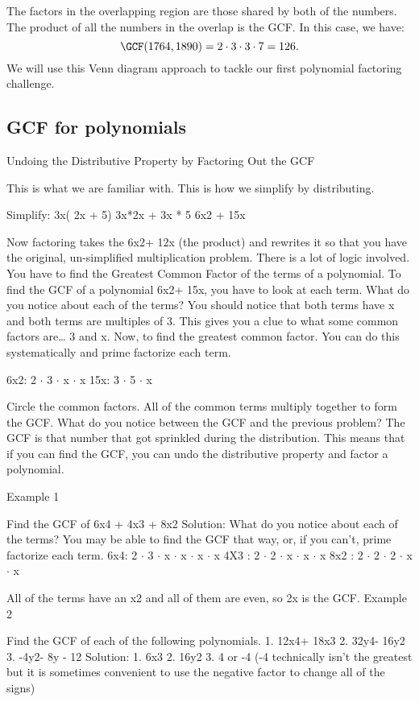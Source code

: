 The factors in the overlapping region are those shared by both of the numbers. The product of all the numbers in the overlap is the GCF. In this case, we have:
\[\GCF(1764, 1890) = 2\cdot3\cdot3\cdot7 = 126.\]
We will use this Venn diagram approach to tackle our first polynomial factoring challenge.

\subsection{{GCF} for polynomials}

Undoing the Distributive Property by Factoring Out the GCF

This is what we are familiar with. This is how we simplify by distributing.

 Simplify:
 3x( 2x + 5)
 3x*2x + 3x * 5
 6x2 + 15x

Now factoring takes the 6x2+ 12x (the product) and rewrites it so that you have the original, un-simplified multiplication problem. There is a lot of logic involved. You have to find the Greatest Common Factor of the terms of a polynomial. To find the GCF of a polynomial 6x2+ 15x, you have to look at each term. What do you notice about each of the terms? You should notice that both terms have x and both terms are multiples of 3. This gives you a clue to what some common factors are\ldots{} 3 and x. Now, to find the greatest common factor. You can do this systematically and prime factorize each term.

 6x2: 2 $\cdot$ 3 $\cdot$ x $\cdot$ x 
15x: 3 $\cdot$ 5 $\cdot$ x 

Circle the common factors. All of the common terms multiply together to form the GCF. What do you notice between the GCF and the previous problem? The GCF is that number that got sprinkled during the distribution. This means that if you can find the GCF, you can undo the distributive property and factor a polynomial.

Example 1

Find the GCF of 6x4 + 4x3 + 8x2 
Solution:
What do you notice about each of the terms? You may be able to find the GCF that way, or, if you can't, prime factorize each term.
6x4: 2 $\cdot$ 3 $\cdot$ x $\cdot$ x $\cdot$ x $\cdot$ x 
4X3 : 2 $\cdot$ 2 $\cdot$ x $\cdot$ x $\cdot$ x 
8x2 : 2 $\cdot$ 2 $\cdot$ 2 $\cdot$ x $\cdot$ x 

All of the terms have an x2 and all of them are even, so 2x is the GCF.
Example 2

Find the GCF of each of the following polynomials. 
1. 12x4+ 18x3
2. 32y4- 16y2
3. -4y2- 8y - 12
Solution:
1. 6x3 
2. 16y2 
3. 4 or -4 (-4 technically isn't the greatest but it is sometimes convenient to use the negative factor to change all of the signs)

